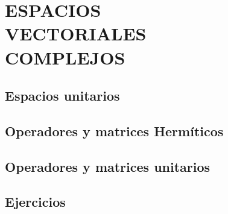 \chapter[ESPACIOS VECTORIALES COMPLEJOS]{ESPACIOS \\ VECTORIALES \\ COMPLEJOS}\label{chap:espacios_complejos}
\printchaptertableofcontents

\section{Espacios unitarios}

\section{Operadores y matrices Hermíticos}

\section{Operadores y matrices unitarios}

\section{Ejercicios}